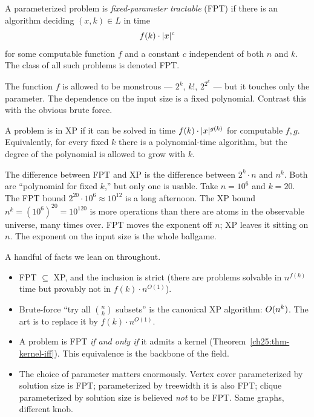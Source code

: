 \begin{definition}\label{ch25:def-fpt}
A parameterized problem is \emph{fixed-parameter tractable} (FPT) if there is an algorithm deciding $(x,k)\in L$ in time
\[
  f(k)\cdot \lvert x\rvert^{c}
\]
for some computable function $f$ and a constant $c$ independent of both $n$ and $k$. The class of all such problems is denoted FPT.
\end{definition}

The function $f$ is allowed to be monstrous --- $2^k$, $k!$, $2^{2^k}$ --- but it touches only the parameter. The dependence on the input size is a fixed polynomial. Contrast this with the obvious brute force.

\begin{definition}\label{ch25:def-xp}
A problem is in XP if it can be solved in time $f(k)\cdot \lvert x\rvert^{g(k)}$ for computable $f,g$. Equivalently, for every fixed $k$ there is a polynomial-time algorithm, but the degree of the polynomial is allowed to grow with $k$.
\end{definition}

\begin{intuitionbox}
The difference between FPT and XP is the difference between $2^k\cdot n$ and $n^k$. Both are ``polynomial for fixed $k$,'' but only one is usable. Take $n=10^6$ and $k=20$. The FPT bound $2^{20}\cdot 10^6 \approx 10^{12}$ is a long afternoon. The XP bound $n^k = (10^6)^{20} = 10^{120}$ is more operations than there are atoms in the observable universe, many times over. FPT moves the exponent off $n$; XP leaves it sitting on $n$. The exponent on the input size is the whole ballgame.
\end{intuitionbox}

\begin{focusbox}
A handful of facts we lean on throughout.
\begin{itemize}
  \item FPT $\subseteq$ XP, and the inclusion is strict (there are problems solvable in $n^{f(k)}$ time but provably not in $f(k)\cdot n^{O(1)}$).
  \item Brute-force ``try all $\binom{n}{k}$ subsets'' is the canonical XP algorithm: $O(n^k)$. The art is to replace it by $f(k)\cdot n^{O(1)}$.
  \item A problem is FPT \emph{if and only if} it admits a kernel (Theorem~\ref{ch25:thm-kernel-iff}). This equivalence is the backbone of the field.
  \item The choice of parameter matters enormously. Vertex cover parameterized by solution size is FPT; parameterized by treewidth it is also FPT; clique parameterized by solution size is believed \emph{not} to be FPT. Same graphs, different knob.
\end{itemize}
\end{focusbox}

